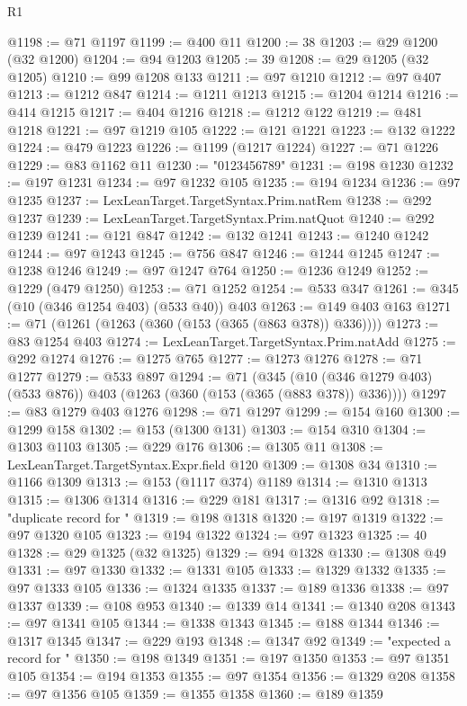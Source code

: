 \begin{lexlean}{R1}
\begin{coremodule}
{{{{{{{{{{{{{{{{{{{{{{{{{{{{{{{{{{{{{{{{{{{{{{{{{{{{{{{{{{{{{{{{{{{{{{{{{{{{{{{{{{{{{{{{{{{{{{{{{{{{{{{{{{{{{{{{{{{{{{{{{{{{{{{{{{{{{{{{{{{{{{{{{{{{{{{{{{{{{{{{{{{{{{{{{{{{{{{{{{{{{{{{{{@1198 := @71 @1197
@1199 := @400 @11
@1200 := 38
@1203 := @29 @1200 (@32 @1200)
@1204 := @94 @1203
@1205 := 39
@1208 := @29 @1205 (@32 @1205)
@1210 := @99 @1208 @133
@1211 := @97 @1210
@1212 := @97 @407
@1213 := @1212 @847
@1214 := @1211 @1213
@1215 := @1204 @1214
@1216 := @414 @1215
@1217 := @404 @1216
@1218 := @1212 @122
@1219 := @481 @1218
@1221 := @97 @1219 @105
@1222 := @121 @1221
@1223 := @132 @1222
@1224 := @479 @1223
@1226 := @1199 (@1217 @1224)
@1227 := @71 @1226
@1229 := @83 @1162 @11
@1230 := "0123456789"
@1231 := @198 @1230
@1232 := @197 @1231
@1234 := @97 @1232 @105
@1235 := @194 @1234
@1236 := @97 @1235
@1237 := LexLeanTarget.TargetSyntax.Prim.natRem
@1238 := @292 @1237
@1239 := LexLeanTarget.TargetSyntax.Prim.natQuot
@1240 := @292 @1239
@1241 := @121 @847
@1242 := @132 @1241
@1243 := @1240 @1242
@1244 := @97 @1243
@1245 := @756 @847
@1246 := @1244 @1245
@1247 := @1238 @1246
@1249 := @97 @1247 @764
@1250 := @1236 @1249
@1252 := @1229 (@479 @1250)
@1253 := @71 @1252
@1254 := @533 @347
@1261 := @345 (@10 (@346 @1254 @403) (@533 @40)) @403
@1263 := @149 @403 @163
@1271 := @71 (@1261 (@1263 (@360 (@153 (@365 (@863 @378)) @336))))
@1273 := @83 @1254 @403
@1274 := LexLeanTarget.TargetSyntax.Prim.natAdd
@1275 := @292 @1274
@1276 := @1275 @765
@1277 := @1273 @1276
@1278 := @71 @1277
@1279 := @533 @897
@1294 := @71
    (@345 (@10 (@346 @1279 @403) (@533 @876)) @403 (@1263 (@360 (@153 (@365 (@883 @378)) @336))))
@1297 := @83 @1279 @403 @1276
@1298 := @71 @1297
@1299 := @154 @160
@1300 := @1299 @158
@1302 := @153 (@1300 @131)
@1303 := @154 @310
@1304 := @1303 @1103
@1305 := @229 @176
@1306 := @1305 @11
@1308 := LexLeanTarget.TargetSyntax.Expr.field @120
@1309 := @1308 @34
@1310 := @1166 @1309
@1313 := @153 (@1117 @374) @1189
@1314 := @1310 @1313
@1315 := @1306 @1314
@1316 := @229 @181
@1317 := @1316 @92
@1318 := "duplicate record for "
@1319 := @198 @1318
@1320 := @197 @1319
@1322 := @97 @1320 @105
@1323 := @194 @1322
@1324 := @97 @1323
@1325 := 40
@1328 := @29 @1325 (@32 @1325)
@1329 := @94 @1328
@1330 := @1308 @49
@1331 := @97 @1330
@1332 := @1331 @105
@1333 := @1329 @1332
@1335 := @97 @1333 @105
@1336 := @1324 @1335
@1337 := @189 @1336
@1338 := @97 @1337
@1339 := @108 @953
@1340 := @1339 @14
@1341 := @1340 @208
@1343 := @97 @1341 @105
@1344 := @1338 @1343
@1345 := @188 @1344
@1346 := @1317 @1345
@1347 := @229 @193
@1348 := @1347 @92
@1349 := "expected a record for "
@1350 := @198 @1349
@1351 := @197 @1350
@1353 := @97 @1351 @105
@1354 := @194 @1353
@1355 := @97 @1354
@1356 := @1329 @208
@1358 := @97 @1356 @105
@1359 := @1355 @1358
@1360 := @189 @1359
}}}}}}}}}}}}}}}}}}}}}}}}}}}}}}}}}}}}}}}}}}}}}}}}}}}}}}}}}}}}}}}}}}}}}}}}}}}}}}}}}}}}}}}}}}}}}}}}}}}}}}}}}}}}}}}}}}}}}}}}}}}}}}}}}}}}}}}}}}}}}}}}}}}}}}}}}}}}}}}}}}}}}}}}}}}}}}}}}}}}}}}}}}
\end{coremodule}
\end{lexlean}
